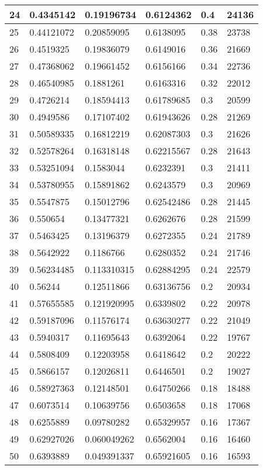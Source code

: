 \begin{longtable}{|l|l|l|l|l|l|}
24 & 0.4345142 & 0.19196734 & 0.6124362 & 0.4 & 24136 \\ \hline 
25 & 0.44121072 & 0.20859095 & 0.6138095 & 0.38 & 23738 \\ \hline 
26 & 0.4519325 & 0.19836079 & 0.6149016 & 0.36 & 21669 \\ \hline 
27 & 0.47368062 & 0.19661452 & 0.6156166 & 0.34 & 22736 \\ \hline 
28 & 0.46540985 & 0.1881261 & 0.6163316 & 0.32 & 22012 \\ \hline 
29 & 0.4726214 & 0.18594413 & 0.61789685 & 0.3 & 20599 \\ \hline 
30 & 0.4949586 & 0.17107402 & 0.61943626 & 0.28 & 21269 \\ \hline 
31 & 0.50589335 & 0.16812219 & 0.62087303 & 0.3 & 21626 \\ \hline 
32 & 0.52578264 & 0.16318148 & 0.62215567 & 0.28 & 21643 \\ \hline 
33 & 0.53251094 & 0.1583044 & 0.6232391 & 0.3 & 21411 \\ \hline 
34 & 0.53780955 & 0.15891862 & 0.6243579 & 0.3 & 20969 \\ \hline 
35 & 0.5547875 & 0.15012796 & 0.62542486 & 0.28 & 21445 \\ \hline 
36 & 0.550654 & 0.13477321 & 0.6262676 & 0.28 & 21599 \\ \hline 
37 & 0.5463425 & 0.13196379 & 0.6272355 & 0.24 & 21789 \\ \hline 
38 & 0.5642922 & 0.1186766 & 0.6280352 & 0.24 & 21746 \\ \hline 
39 & 0.56234485 & 0.113310315 & 0.62884295 & 0.24 & 22579 \\ \hline 
40 & 0.56244 & 0.12511866 & 0.63136756 & 0.2 & 20934 \\ \hline 
41 & 0.57655585 & 0.121920995 & 0.6339802 & 0.22 & 20978 \\ \hline 
42 & 0.59187096 & 0.11576174 & 0.63630277 & 0.22 & 21049 \\ \hline 
43 & 0.5940317 & 0.11695643 & 0.6392064 & 0.22 & 19767 \\ \hline 
44 & 0.5808409 & 0.12203958 & 0.6418642 & 0.2 & 20222 \\ \hline 
45 & 0.5866157 & 0.12026811 & 0.6446501 & 0.2 & 19027 \\ \hline 
46 & 0.58927363 & 0.12148501 & 0.64750266 & 0.18 & 18488 \\ \hline 
47 & 0.6073514 & 0.10639756 & 0.6503658 & 0.18 & 17068 \\ \hline 
48 & 0.6255889 & 0.09780282 & 0.65329957 & 0.16 & 17367 \\ \hline 
49 & 0.62927026 & 0.060049262 & 0.6562004 & 0.16 & 16460 \\ \hline 
50 & 0.6393889 & 0.049391337 & 0.65921605 & 0.16 & 16593 \\ \hline 
\end{longtable}